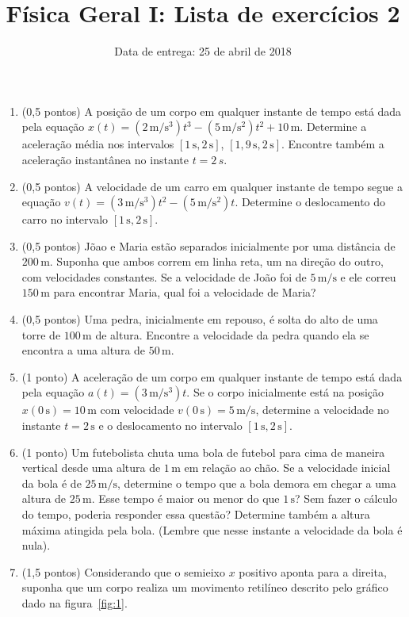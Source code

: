 \documentclass[fontsize=12pt]{scrartcl}
\title{Física Geral I: Lista de exercícios 2}
\author{Data de entrega: 25 de abril de 2018}
\date{}
\newcommand{\un}[1]{\mathrm{#1}}
\begin{document}
\maketitle
\begin{enumerate}
\item (0,5 pontos) A posição de um corpo em qualquer instante de tempo
  está dada pela equação
  $x(t)=(2\,\un m/\un{s}^3)t^3-(5\,\un m/\un{s}^2)t^2+10\,\un
  m$. Determine a aceleração média nos intervalos
  $[1\,\un{s},2\,\un{s}]$, $[1,9\,\un s,2\,\un s]$. Encontre também a
  aceleração instantânea no instante $t=2\,s$.
\item (0,5 pontos) A velocidade de um carro em qualquer instante de
  tempo segue a equação
  $v(t)=(3\,\un m/\un{s}^3)t^2-(5\,\un m/\un{s}^2)t$. Determine o
  deslocamento do carro no intervalo $[1\,\un s,2\,\un s]$.
\item (0,5 pontos) Jõao e Maria estão separados inicialmente por uma
  distância de $200\,\un m$. Suponha que ambos correm em linha reta,
  um na direção do outro, com velocidades constantes. Se a velocidade
  de João foi de $5\,\un m/\un s$ e ele correu $150\,\un m$ para
  encontrar Maria, qual foi a velocidade de Maria?
\item (0,5 pontos) Uma pedra, inicialmente em repouso, é solta do alto
  de uma torre de $100\,\un m$ de altura. Encontre a velocidade da
  pedra quando ela se encontra a uma altura de $50\,\un m$.
\item (1 ponto) A aceleração de um corpo em qualquer instante de tempo
  está dada pela equação $a(t)=(3\,\un m/\un{s}^3)t$. Se o corpo
  inicialmente está na posição $x(0\,\un s)=10\,\un m$ com velocidade
  $v(0\,\un s)=5\,\un m/\un s$, determine a velocidade no instante
  $t=2\,\un s$ e o deslocamento no intervalo $[1\,\un s,2\,\un s]$.
\item (1 ponto) Um futebolista chuta uma bola de futebol para cima de
  maneira vertical desde uma altura de $1\,\un m$ em relação ao
  chão. Se a velocidade inicial da bola é de $25\,\un m/\un s$,
  determine o tempo que a bola demora em chegar a uma altura de
  $25\,\un m$. Esse tempo é maior ou menor do que $1\,\un s$?  Sem
  fazer o cálculo do tempo, poderia responder essa questão? Determine
  também a altura máxima atingida pela bola. (Lembre que nesse
  instante a velocidade da bola é nula).
\item (1,5 pontos) Considerando que o semieixo $x$ positivo aponta
  para a direita, suponha que um corpo realiza um movimento retilíneo
  descrito pelo gráfico dado na figura~\ref{fig:1}.

\end{enumerate}
\end{document}
